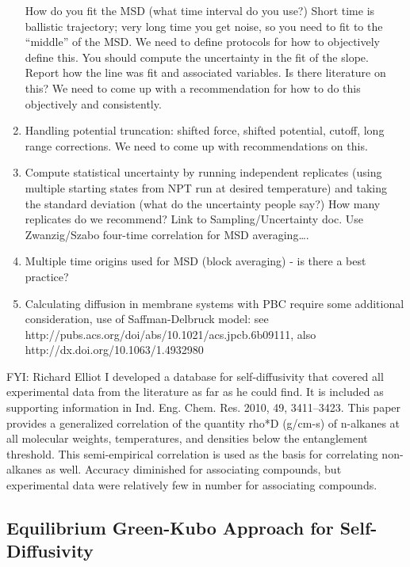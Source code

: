 \documentclass[9pt]{livecoms}
\begin{document}
\begin{enumerate}
	How do you fit the MSD (what time interval do you use?) Short time is ballistic trajectory; very long time you get noise, so you need to fit to the “middle” of the MSD. We need to define protocols for how to objectively define this. You should compute the uncertainty in the fit of the slope. Report how the line was fit and associated variables. Is there literature on this? We need to come up with a recommendation for how to do this objectively and consistently. 
	\item Handling potential truncation: shifted force, shifted potential, cutoff, long range corrections. We need to come up with recommendations on this.
	\item Compute statistical uncertainty by running independent replicates (using multiple starting states from NPT run at desired temperature) and taking the standard deviation (what do the uncertainty people say?) How many replicates do we recommend? Link to Sampling/Uncertainty doc. Use Zwanzig/Szabo four-time correlation for MSD averaging….
	\item Multiple time origins used for MSD (block averaging) - is there a best practice?
	\item Calculating diffusion in membrane systems with PBC require some additional consideration, use of Saffman-Delbruck model: see http://pubs.acs.org/doi/abs/10.1021/acs.jpcb.6b09111, also http://dx.doi.org/10.1063/1.4932980
\end{enumerate}

FYI: Richard Elliot I developed a database for self-diffusivity that covered all experimental data from the literature as far as he could find. It is included as supporting information in Ind. Eng. Chem. Res. 2010, 49, 3411–3423. This paper provides a generalized correlation of the quantity rho*D (g/cm-s) of n-alkanes at all molecular weights, temperatures, and densities below the entanglement threshold. This semi-empirical correlation is used as the basis for correlating non-alkanes as well. Accuracy diminished for associating compounds, but experimental data were relatively few in number for associating compounds.

\subsection{Equilibrium Green-Kubo Approach for Self-Diffusivity}
\end{document}
